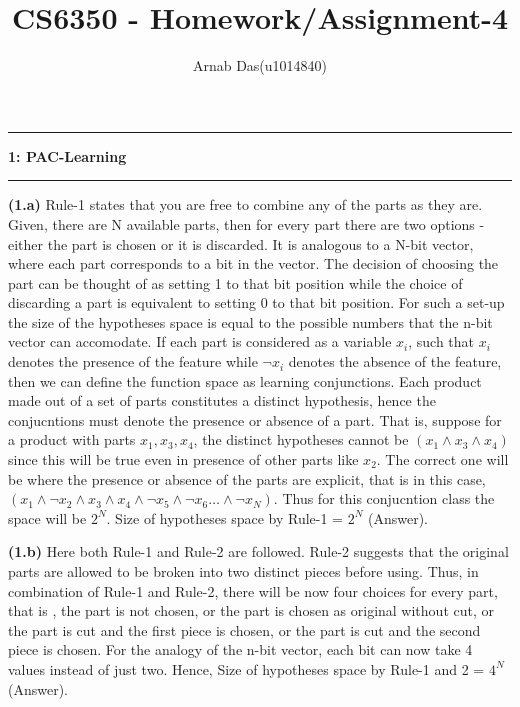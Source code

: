 \documentclass{article}
\title{CS6350 - Homework/Assignment-4}
\author{Arnab Das(u1014840)}
\newcommand\question[2]{\vspace{.25in}\hrule\textbf{#1: #2}\hrule\vspace{.10in}}
\renewcommand\part[1]{\vspace{.10in}\textbf{(#1)}}
\begin{document}
  \maketitle
  \newpage
  \newcommand\NAME{ARNAB DAS}
  \newcommand\UID{uxxxxxxx}
  \newcommand\HWNUM{4}
  
  \question{1}{PAC-Learning}
  \part{1.a} Rule-1 states that you are free to combine any of the parts as they are. Given, there are N available parts, then for every part there are two options - either the part is chosen or it is discarded. It is analogous to a N-bit vector, where each part corresponds to a bit in the vector. The decision of choosing the part can be thought of as setting 1 to that bit position while the choice of discarding a part is equivalent to setting 0 to that bit position. For such a set-up the size of the hypotheses space is equal to the possible numbers that the n-bit vector can accomodate. If each part is considered as a variable $x_{i}$, such that $x_{i}$ denotes the presence of the feature while $\neg {x_{i}}$ denotes the absence of the feature, then we can define the function space as learning conjunctions. Each product made out of a set of parts constitutes a distinct hypothesis, hence the conjucntions must denote the presence or absence of a part. That is, suppose for a product with parts $x_{1}, x_{3}, x_{4}$, the distinct hypotheses cannot be $(x_{1} \wedge x_{3} \wedge x_{4})$ since this will be true even in presence of other parts like $x_{2}$. The correct one will be where the presence or absence of the parts are explicit, that is in this case, $(x_{1} \wedge \neg x_{2} \wedge x_{3} \wedge x_{4} \wedge \neg x_{5} \wedge \neg x_{6} \dots \wedge \neg x_{N})$. Thus for this conjucntion class the space will be $2^N$. \newline
  \hspace*{0.5cm} Size of hypotheses space by Rule-1 = $2^N$ (Answer). \newline
  
  \part{1.b} Here both Rule-1 and Rule-2 are followed. Rule-2 suggests that the original parts are allowed to be broken into two distinct pieces before using. Thus, in combination of Rule-1 and Rule-2, there will be now four choices for every part, that is , the part is not chosen, or the part is chosen as original without cut, or the part is cut and the first piece is chosen, or the part is cut and the second piece is chosen. For the analogy of the n-bit vector, each bit can now take 4 values instead of just two. Hence, \newline
  \hspace*{0.5cm} Size of hypotheses space by Rule-1 and 2 = $4^N$ (Answer). \newline
  
\end{document}
